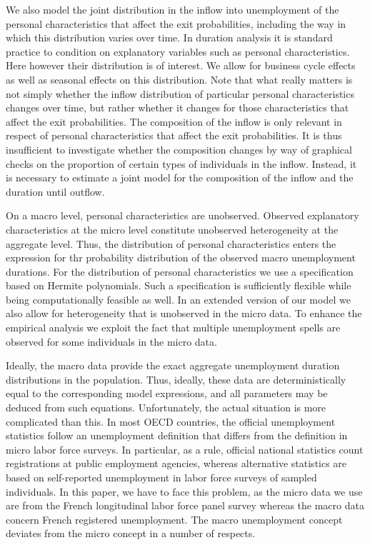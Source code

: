 \documentclass[12pt]{article}
\theoremstyle{definition}
\begin{document}
We also model the joint distribution in the inflow into unemployment of the personal characteristics that affect the exit probabilities, including the way in which this distribution varies over time. In duration analysis it is standard practice to condition on explanatory variables such as personal characteristics. Here however their distribution is of interest. We allow for business cycle effects as well as seasonal effects on this distribution. Note that what really matters is not simply whether the inflow distribution of particular personal characteristics changes over time, but rather whether it changes for those characteristics that affect the exit probabilities. The composition of the inflow is only relevant in respect of personal characteristics that affect the exit probabilities. It is thus insufficient to investigate whether the composition changes by way of graphical checks on the proportion of certain types of individuals in the inflow. Instead, it is necessary to estimate a joint model for the composition of the inflow and the duration until outflow. 


On a macro level, personal characteristics are unobserved. Observed explanatory characteristics at the micro level constitute unobserved heterogeneity at the aggregate level. Thus, the distribution of personal characteristics enters the expression for thr probability distribution of the observed macro unemployment durations. For the distribution of personal characteristics we use a specification based on Hermite polynomials. Such a specification is sufficiently flexible while being computationally feasible as well. In an extended version of our model we also allow for heterogeneity that is unobserved in the micro data. To enhance the empirical analysis we exploit the fact that multiple unemployment spells are observed for some individuals in the micro data.

Ideally, the macro data provide the exact aggregate unemployment duration distributions in the population. Thus, ideally, these data are deterministically equal to the corresponding model expressions, and all parameters may be deduced from such equations. Unfortunately, the actual situation is more complicated than this. In most OECD countries, the official unemployment statistics follow an unemployment definition that differs from the definition in micro labor force surveys. In particular, as a rule, official national statistics count registrations at public employment agencies, whereas alternative statistics are based on self-reported unemployment in labor force surveys of sampled individuals. In this paper, we have to face this problem, as the micro data we use are from the French longitudinal labor force panel survey whereas the macro data concern French registered unemployment. The macro unemployment concept deviates from the micro concept in a number of respects.
\end{document}

